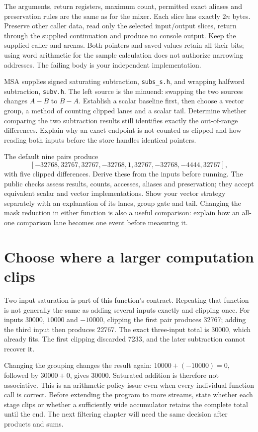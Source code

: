 The arguments, return registers, maximum count, permitted exact aliases and
preservation rules are the same as for the mixer. Each slice has exactly $2n$
bytes. Preserve other caller data, read only the selected input/output slices,
return through the supplied continuation and produce no console output. Keep the
supplied caller and arenas. Both pointers and saved values retain all their bits;
using word arithmetic for the sample calculation does not authorize narrowing
addresses. The failing body is your independent implementation.

MSA supplies signed saturating subtraction, \texttt{subs\_s.h}, and wrapping
halfword subtraction, \texttt{subv.h}. The left source is the minuend: swapping
the two sources changes $A-B$ to $B-A$. Establish a scalar baseline first, then
choose a vector group, a method of counting clipped lanes and a scalar tail.
Determine whether comparing the two subtraction results still identifies exactly
the out-of-range differences. Explain why an exact endpoint is not counted as clipped and how reading both
inputs before the store handles identical pointers.

The default nine pairs produce
\[
  [-32768,32767,32767,-32768,1,32767,-32768,-4444,32767],
\]
with five clipped differences. Derive these from the inputs before running.
The public checks assess results, counts, accesses, aliases and preservation;
they accept equivalent scalar and vector implementations. Show your vector
strategy separately with an explanation of its lanes, group gate and tail.
Changing the mask reduction in either function is also a useful comparison:
explain how an all-one comparison lane becomes one event before measuring it.

\section{Choose where a larger computation clips}

Two-input saturation is part of this function's contract. Repeating that function
is not generally the same as adding several inputs exactly and clipping once.
For inputs $30000$, $10000$ and $-10000$, clipping the first pair produces 32767;
adding the third input then produces 22767. The exact three-input total is 30000,
which already fits. The first clipping discarded 7233, and the later subtraction
cannot recover it.

Changing the grouping changes the result again: $10000+(-10000)=0$, followed by
$30000+0$, gives 30000. Saturated addition is therefore not associative. This is
an arithmetic policy issue even when every individual function call is correct.
Before extending the program to more streams, state whether each stage clips or
whether a sufficiently wide accumulator retains the complete total until the end.
The next filtering chapter will need the same decision after products and sums.

